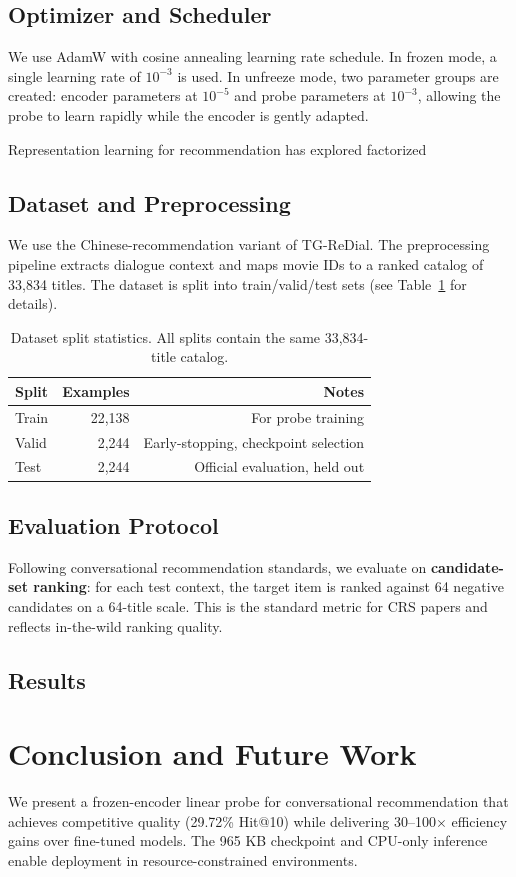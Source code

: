 \documentclass[conference]{IEEEtran}
\begin{document}
\subsection{Optimizer and Scheduler}
We use AdamW with cosine annealing learning rate schedule. In frozen mode, a
single learning rate of $10^{-3}$ is used. In unfreeze mode, two parameter
groups are created: encoder parameters at $10^{-5}$ and probe parameters at
$10^{-3}$, allowing the probe to learn rapidly while the encoder is gently
adapted.

Representation learning for recommendation has explored factorized
\subsection{Dataset and Preprocessing}
We use the Chinese-recommendation variant of TG-ReDial. The preprocessing
pipeline extracts dialogue context and maps movie IDs to a ranked catalog of
33,834 titles. The dataset is split into train/valid/test sets (see
Table~\ref{tab:split} for details).

\begin{table}[h]
\centering
\caption{Dataset split statistics. All splits contain the same 33,834-title catalog.}
\label{tab:split}
\begin{tabular}{lrr}
\toprule
Split & Examples & Notes \\
\midrule
Train & 22,138 & For probe training \\
Valid & 2,244 & Early-stopping, checkpoint selection \\
Test  & 2,244 & Official evaluation, held out \\
\bottomrule
\end{tabular}
\end{table}

\subsection{Evaluation Protocol}
Following conversational recommendation standards, we evaluate on
\textbf{candidate-set ranking}: for each test context, the target item is
ranked against 64 negative candidates on a 64-title scale. This is the
standard metric for CRS papers and reflects in-the-wild ranking quality.

\subsection{Results}
\section{Conclusion and Future Work}
We present a frozen-encoder linear probe for conversational recommendation
that achieves competitive quality (29.72\% Hit@10) while delivering
30--100$\times$ efficiency gains over fine-tuned models. The 965 KB
checkpoint and CPU-only inference enable deployment in resource-constrained
environments.
\end{document}

